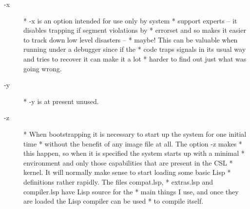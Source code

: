 \documentclass[a4paper,11pt]{article}
\begin{document}
\begin{description}
\item [{\ttfamily -x}] 
          * {\ttfamily -x} is an option intended for use only by system
          * support experts -- it disables trapping if segment violations by
          * errorset and so makes it easier to track down low level disasters --
          * maybe!  This can be valuable when running under a debugger since if the
          * code traps signals in its usual way and tries to recover it can make it a lot
          * harder to find out just what was going wrong.

\item [{\ttfamily -y}] 
          * {\ttfamily -y } is at present unused.

\item [{\ttfamily -z}] 
          * When bootstrapping it is necessary to start up the system for one initial time
          * without the benefit of any image file at all. The option {\ttfamily -z} makes
          * this happen, so when it is specified the system starts up with a minimal
          * environment and only those capabilities that are present in the CSL
          * kernel. It will normally make sense to start loading some basic Lisp
          * definitions rather rapidly. The files {\ttfamily compat.lsp},
          * {\ttfamily extras.lsp} and {\ttfamily compiler.lsp} have Lisp source for the
          * main things I use, and once they are loaded the Lisp compiler can be used
          * to compile itself.

\end{description} %

\end{document}

